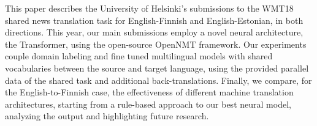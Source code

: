 This paper describes the University of Helsinki's submissions to the WMT18 shared news translation task for English-Finnish and English-Estonian, in both directions. This year, our main submissions employ a novel neural architecture, the Transformer, using the open-source OpenNMT framework. Our experiments couple domain labeling and fine tuned multilingual models with shared vocabularies between the source and target language, using the provided parallel data of the shared task and additional back-translations. Finally, we compare, for the English-to-Finnish case, the effectiveness of different machine translation architectures, starting from a rule-based approach to our best neural model, analyzing the output and highlighting future research.

